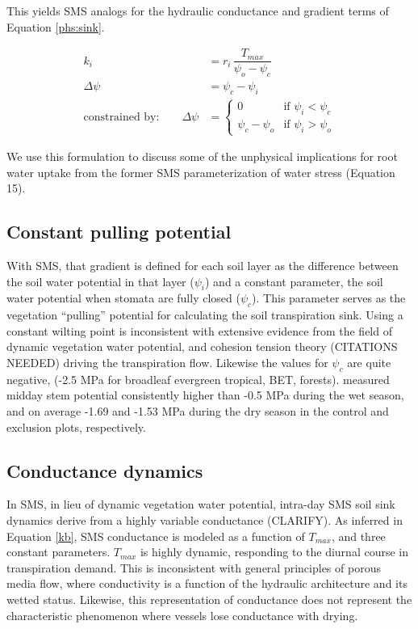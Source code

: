 \documentclass[draft,linenumbers]{agujournal}
\begin{document}
    This yields SMS analogs for the hydraulic conductance and gradient terms of Equation \ref{phs:sink}.
    \begin{linenomath*}
    \begin{equation} \begin{aligned}
    k_i &= r_i \, \dfrac{T_{max}}{\psi_{o}-\psi_{c}} \\
    \Delta\psi &=  \psi_{c}-\psi_i \\
    \mbox{constrained by:} \qquad
    \Delta\psi &=
    \begin{cases}
    0                          & \text{if } \psi_i<\psi_{c}  \\
    \psi_{c}-\psi_{o} & \text{if } \psi_i>\psi_{o}
    \label{kb}
    \end{cases}
    \end{aligned}\end{equation}
    \end{linenomath*}

   We use this formulation to discuss some of the unphysical implications for root water uptake from the former SMS parameterization of water stress (Equation 15).
    
    \subsection{Constant pulling potential}
    With SMS, that gradient is defined for each soil layer as 
    the difference between the soil water potential in that layer ($\psi_i$) 
    and a constant parameter, the soil water potential when stomata are fully closed ($\psi_{c}$).
    This parameter serves as the vegetation ``pulling'' potential for calculating the soil transpiration sink.
    Using a constant wilting point is inconsistent with extensive evidence from the field of dynamic vegetation water potential, and cohesion tension theory (CITATIONS NEEDED) driving the transpiration flow.
    Likewise the values for $\psi_{c}$ are quite negative, (-2.5 MPa for broadleaf evergreen tropical, BET, forests). 
    \cite{fisher2006} measured midday stem potential consistently higher than -0.5 MPa during the wet season, and on average -1.69 and -1.53 MPa during the dry season in the control and exclusion plots, respectively.
    
    \subsection{Conductance dynamics}
    In SMS, in lieu of dynamic vegetation water potential, intra-day SMS soil sink dynamics derive from a highly variable conductance (CLARIFY).
    As inferred in Equation \ref{kb}, SMS conductance is modeled as a function of $T_{max}$, and three constant parameters.
    $T_{max}$ is highly dynamic, responding to the diurnal course in transpiration demand.
    This is inconsistent with general principles of porous media flow, where conductivity is a function of the hydraulic architecture and its wetted status.
    Likewise, this representation of conductance does not represent the characteristic phenomenon where vessels lose conductance with drying.
      
\end{document}
